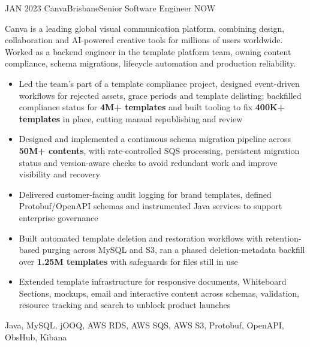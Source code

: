 %
%
%
\begin{experiences}
    \experience 
    {JAN 2023}   {Canva}{Brisbane}{Senior Software Engineer}
    {NOW} {
                    Canva is a leading global visual communication platform, combining design, collaboration and AI-powered creative tools for millions of users worldwide. Worked as a backend engineer in the template platform team, owning content compliance, schema migrations, lifecycle automation and production reliability.
                    \begin{itemize}
                        \item Led the team's part of a template compliance project, designed event-driven workflows for rejected assets, grace periods and template delisting; backfilled compliance status for \textbf{4M+ templates} and built tooling to fix \textbf{400K+ templates} in place, cutting manual republishing and review
                        \item Designed and implemented a continuous schema migration pipeline across \textbf{50M+ contents}, with rate-controlled SQS processing, persistent migration status and version-aware checks to avoid redundant work and improve visibility and recovery
                        \item Delivered customer-facing audit logging for brand templates, defined Protobuf/OpenAPI schemas and instrumented Java services to support enterprise governance
                        \item Built automated template deletion and restoration workflows with retention-based purging across MySQL and S3, ran a phased deletion-metadata backfill over \textbf{1.25M templates} with safeguards for files still in use
                        \item Extended template infrastructure for responsive documents, Whiteboard Sections, mockups, email and interactive content across schemas, validation, resource tracking and search to unblock product launches
                  \end{itemize}
                    }
                    {Java, MySQL, jOOQ, AWS RDS, AWS SQS, AWS S3, Protobuf, OpenAPI, ObsHub, Kibana}

\end{experiences}

